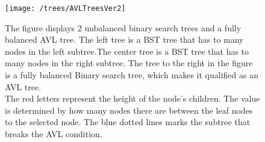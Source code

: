 \begin{figure}[H]
	\centering
	\texttt{[image: /trees/AVLTreesVer2]}	
	\caption{The figure displays 2 unbalanced binary search trees and a fully balanced AVL tree. The left tree is a BST tree that has to many nodes in the left subtree.The center tree is a BST tree that has to many nodes in the right subtree. The tree to the right in the figure is a fully balanced Binary search tree, which makes it qualified as an AVL tree. \\The red letters represent the height of the node's children. The value is determined by how many nodes there are between the leaf nodes to the selected node. The blue dotted lines marks the subtree that breaks the AVL condition.}
	\label{fig:AVLTrees}
\end{figure}
